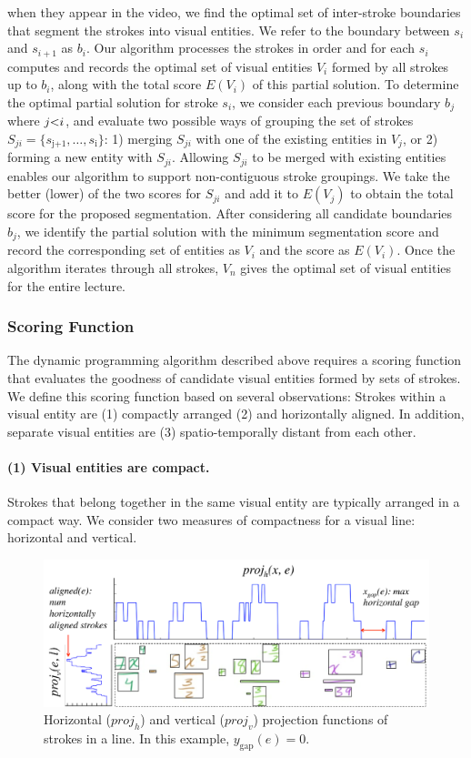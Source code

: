 when they appear in the video, we find the optimal set of inter-stroke
boundaries that segment the strokes into visual entities. We refer to the boundary between $s_i$ and $s_{i+1}$ as
$b_i$.
%
Our algorithm processes the strokes in order and for each $s_i$
computes and records the optimal set of visual entities $V_i$ formed
by all strokes up to $b_i$, along with the total score $E(V_i)$ of
this partial solution.
%
To determine the optimal partial solution for stroke $s_i$, we
consider each previous boundary $b_j$ where
$\setlength{\thickmuskip}{0mu} j<i$, and evaluate two possible ways of
grouping the set of strokes $S_{ji} = \{s_\text{j+1},
\dots,s_\text{i}\}$: 1) merging $S_{ji}$ with one of the existing entities
in $V_j$, or 2) forming a new entity with $S_{ji}$. 
%
Allowing $S_{ji}$ to be merged with existing entities enables our
algorithm to support non-contiguous stroke groupings.
%
We take the better (lower) of the two scores for $S_{ji}$ and add it
to $E(V_j)$ to obtain the total score for the proposed
segmentation. After considering all candidate boundaries $b_j$, we
identify the partial solution with the minimum segmentation score and
record the corresponding set of entities as $V_i$ and the score as $E(V_i)$.
%
Once the algorithm iterates through all strokes, $V_n$ gives the
optimal set of visual entities for the entire lecture.
%
%
\subsubsection{Scoring Function}
The dynamic programming algorithm described above requires a scoring
function that evaluates the goodness of candidate visual entities
formed by sets of strokes. We define this scoring function based on
several observations: Strokes within a visual entity are (1) compactly arranged (2) and horizontally aligned. In addition, separate visual entities are (3) spatio-temporally distant from each other.
%
\paragraph{(1) Visual entities are compact.} Strokes that belong together
in the same visual entity are typically arranged in a compact way. We
consider two measures of compactness for a visual line:
horizontal and vertical.

\begin{figure}[h!]
	\centering
        \includegraphics[width=\textwidth]{figures/projection_function.pdf}
        	\captionsetup{font=footnotesize}
        \caption{Horizontal ($proj_h$) and vertical ($proj_v$) projection functions of strokes in a line. In this example, $y_\text{gap}(e)=0$.}
        \label{Fig:projection_function}
\end{figure}

